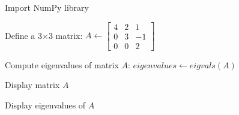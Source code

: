 \begin{algorithm}
\caption{Find Eigenvalues of a 3×3 Matrix}
\begin{algorithmic}[1]

\STATE Import NumPy library

\STATE Define a 3×3 matrix:
\STATE $A \gets \begin{bmatrix}
4 & 2 & 1 \\
0 & 3 & -1 \\
0 & 0 & 2
\end{bmatrix}$

\STATE Compute eigenvalues of matrix $A$:
\STATE $eigenvalues \gets eigvals(A)$

\STATE Display matrix $A$

\STATE Display eigenvalues of $A$

\end{algorithmic}
\end{algorithm}